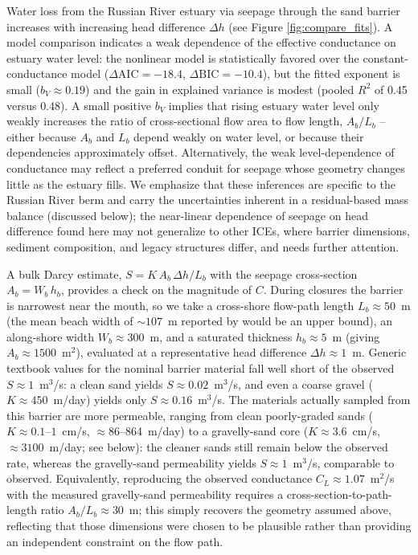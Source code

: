 \documentclass[preprint,12pt,authoryear]{elsarticle}
\begin{document}
Water loss from the Russian River estuary via seepage through the sand barrier increases with increasing head difference $\Delta h$ (see Figure \ref{fig:compare_fits}). A model comparison indicates a weak dependence of the effective conductance on estuary water level: the nonlinear model is statistically favored over the constant-conductance model ($\Delta\mathrm{AIC} = -18.4$, $\Delta\mathrm{BIC} = -10.4$), but the fitted exponent is small ($b_V \approx 0.19$) and the gain in explained variance is modest (pooled $R^2$ of 0.45 versus 0.48). A small positive $b_V$ implies that rising estuary water level only weakly increases the ratio of cross-sectional flow area to flow length, $A_b/L_b$ -- either because $A_b$ and $L_b$ depend weakly on water level, or because their dependencies approximately offset. Alternatively, the weak level-dependence of conductance may reflect a preferred conduit for seepage whose geometry changes little as the estuary fills. We emphasize that these inferences are specific to the Russian River berm and carry the uncertainties inherent in a residual-based mass balance (discussed below); the near-linear dependence of seepage on head difference found here may not generalize to other ICEs, where barrier dimensions, sediment composition, and legacy structures differ, and needs further attention.

A bulk Darcy estimate, $S = K\,A_b\,\Delta h / L_b$ with the seepage cross-section $A_b = W_b\,h_b$, provides a check on the magnitude of $C$. During closures the barrier is narrowest near the mouth, so we take a cross-shore flow-path length $L_b \approx 50$~m (the mean beach width of ${\sim}107$~m reported by \citet{BehrensEtAl_2017_GoatRock} would be an upper bound), an along-shore width $W_b \approx 300$~m, and a saturated thickness $h_b \approx 5$~m (giving $A_b \approx 1500$~m$^2$), evaluated at a representative head difference $\Delta h \approx 1$~m. Generic textbook values for the nominal barrier material fall well short of the observed $S \approx 1$~m$^3$/s: a clean sand \citep[$K \approx 45$~m/day,][]{masters1991introduction} yields $S \approx 0.02$~m$^3$/s, and even a coarse gravel ($K \approx 450$~m/day) yields only $S \approx 0.16$~m$^3$/s. The materials actually sampled from this barrier are more permeable, ranging from clean poorly-graded sands ($K \approx 0.1$--$1$~cm/s, ${\approx}86$--864~m/day) to a gravelly-sand core ($K \approx 3.6$~cm/s, ${\approx}3100$~m/day; see below): the cleaner sands still remain below the observed rate, whereas the gravelly-sand permeability yields $S \approx 1$~m$^3$/s, comparable to observed. Equivalently, reproducing the observed conductance $C_L \approx 1.07$~m$^2$/s with the measured gravelly-sand permeability requires a cross-section-to-path-length ratio $A_b/L_b \approx 30$~m; this simply recovers the geometry assumed above, reflecting that those dimensions were chosen to be plausible rather than providing an independent constraint on the flow path.
\end{document}
